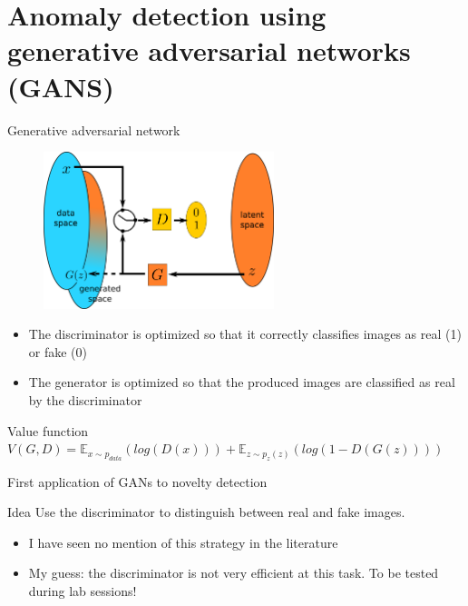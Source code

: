 \documentclass[xcolor=pdftex,dvipsnames,table,mathserif]{beamer}
\begin{document}
\section{Anomaly detection using generative adversarial networks (GANS)}

\begin{frame}{Generative adversarial network \cite{goodfellow_generative_2014}}

  \begin{figure}[ht]
    \centering
    \includegraphics[width=0.6\textwidth]{gan2}
  \end{figure}

  \begin{itemize}
  \item The discriminator is optimized so that it correctly classifies images as real (1) or fake (0)
  \item The generator is optimized so that the produced images are classified as real by the discriminator
  \end{itemize}

  \begin{block}{Value function}
    $V(G,D) = \mathbb{E}_{x \sim p_{data}}(log(D(x))) + \mathbb{E}_{z \sim p_z(z)}(log(1 - D(G(z))))$
  \end{block}

\end{frame}


\begin{frame}{First application of GANs to novelty detection}

  \begin{block}{Idea}
    Use the discriminator to distinguish between real and fake images.
  \end{block}

  \begin{itemize}
  \item I have seen no mention of this strategy in the literature
  \item My guess: the discriminator is not very efficient at this task. To be tested during lab sessions!
  \end{itemize}

\end{frame}
\end{document}
